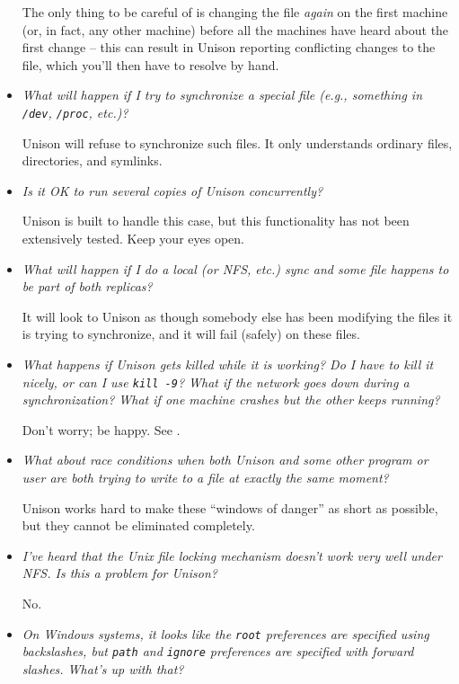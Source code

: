 \begin{itemize}
The only thing to be careful of is changing the file {\em again} on the first
machine (or, in fact, any other machine) before all the machines have
heard about the first change -- this can result in Unison reporting
conflicting changes to the file, which you'll then have to resolve by
hand.

\item {\em What will happen if I try to synchronize a special file (e.g.,
something in \verb|/dev|, \verb|/proc|, etc.)?}

Unison will refuse to synchronize such files.  It only understands
ordinary files, directories, and symlinks.

\item {\em Is it OK to run several copies of Unison concurrently?}

Unison is built to handle this case, but this functionality has not been
extensively tested.  Keep your eyes open.

\item {\em What will happen if I do a local (or NFS, etc.) sync and some
  file happens to be part of both replicas?}

It will look to Unison as though somebody else has been modifying the
files it is trying to synchronize, and it will fail (safely) on these
files.

\item {\em What happens if Unison gets killed while it is working?  Do I
  have to kill it nicely, or can I use {\tt kill -9}? What if the network
  goes down during a synchronization?  What if one machine crashes but
  the other keeps running?}

Don't worry; be happy.  See .

\item {\em What about race conditions when both Unison and some other
  program or user are both trying to write to a file at exactly the same
  moment?} 

Unison works hard to make these ``windows of danger'' as short as
possible, but they cannot be eliminated completely.

\item {\em I've heard that the Unix file locking mechanism doesn't work
  very well under NFS.  Is this a problem for Unison?}

No.

\item {\em On Windows systems, it looks like the {\tt root} preferences
  are specified using backslashes, but {\tt path} and {\tt ignore}
  preferences are specified with forward slashes.  What's up with that?} 


\end{itemize}
